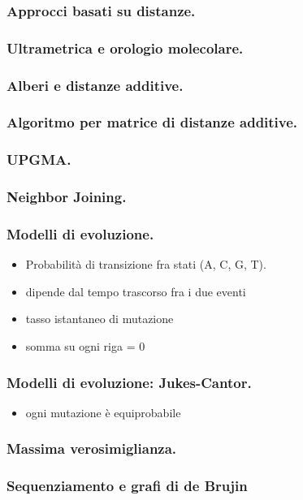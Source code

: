 \begin{frame}[fragile]
\frametitle{Approcci basati su distanze.}
\end{frame}

\begin{frame}[fragile]
\frametitle{Ultrametrica e orologio molecolare.}
\end{frame}

\begin{frame}[fragile]
\frametitle{Alberi e distanze additive.}
\end{frame}

\begin{frame}[fragile]
\frametitle{Algoritmo per matrice di distanze additive.}
\end{frame}

\begin{frame}[fragile]
\frametitle{UPGMA.}
\end{frame}

\begin{frame}[fragile]
\frametitle{Neighbor Joining.}
\end{frame}

\begin{frame}[fragile]
  \frametitle{Modelli di evoluzione.}
\begin{itemize}
\item
  Probabilità di transizione fra stati (A, C, G, T).
%
\item
  dipende dal tempo trascorso fra i due eventi
\item
  tasso istantaneo di mutazione
\item
  somma su ogni riga = $0$
\end{itemize}
\end{frame}

\begin{frame}[fragile]
  \frametitle{Modelli di evoluzione: Jukes-Cantor.}
\begin{itemize}
\item
  ogni mutazione è equiprobabile
\end{itemize}
\end{frame}

\begin{frame}[fragile]
\frametitle{Massima verosimiglianza.}
\end{frame}



\begin{frame}[fragile]
\frametitle{Sequenziamento e grafi di de Brujin}
\end{frame}



